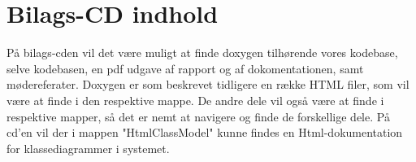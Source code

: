 \chapter{Bilags-CD indhold}\label{chap:bilagsCD}
På bilags-cden vil det være muligt at finde doxygen tilhørende vores kodebase, selve kodebasen, en pdf udgave af rapport og af dokomentationen, samt mødereferater.
Doxygen er som beskrevet tidligere en række HTML filer, som vil være at finde i den respektive mappe.
De andre dele vil også være at finde i respektive mapper, så det er nemt at navigere og finde de forskellige dele. På cd'en vil der i mappen "HtmlClassModel" kunne findes en Html-dokumentation for klassediagrammer i systemet.